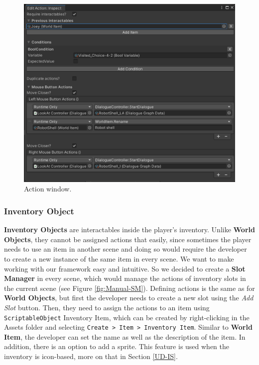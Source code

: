 \begin{figure}[H]
\centering
\includegraphics[width=.8\linewidth]{img/User doc/action_window.png}
\caption{Action window.}
\label{fig:BaSS-manual}
\end{figure}

\subsubsection{Inventory Object}
\textbf{Inventory Objects} are interactables inside the player's inventory. Unlike \textbf{World Objects}, they cannot be assigned actions that easily, since sometimes the player needs to use an item in another scene and doing so would require the developer to create a new instance of the same item in every scene. We want to make working with our framework easy and intuitive. So we decided to create a \textbf{Slot Manager} in every scene, which would manage the actions of inventory slots in the current scene (see Figure \ref{fig:Manual-SM}). Defining actions is the same as for \textbf{World Objects}, but first the developer needs to create a new slot using the \textit{Add Slot} button. Then, they need to assign the actions to an item using \verb|ScriptableObject| Inventory Item, which can be created by right-clicking in the Assets folder and selecting \verb|Create > Item > Inventory Item|. Similar to \textbf{World Item}, the developer can set the name as well as the description of the item. In addition, there is an option to add a sprite. This feature is used when the inventory is icon-based, more on that in Section \ref{UD-IS}.


